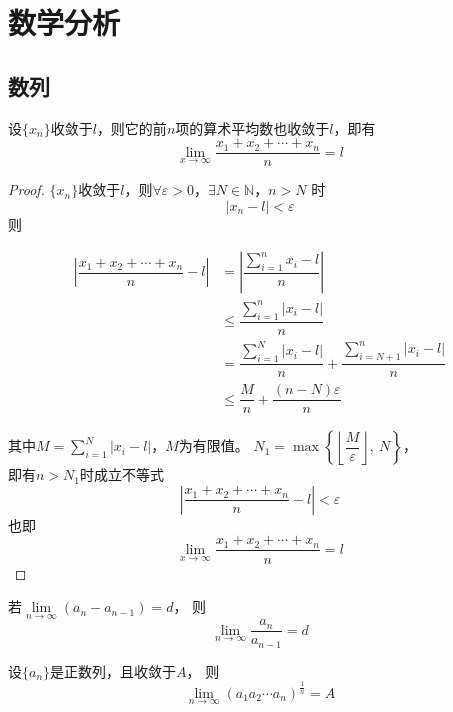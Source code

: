 \chapter{数学分析}

\section{数列}

\begin{proposition}[Cauthy命题]

    设$\{x_n\}$收敛于$l$，则它的前$n$项的算术平均数也收敛于$l$，即有
    $$\lim_{x\to\infty}{\dfrac{x_1 + x_2 + \cdots + x_n}{n}} = l$$

\end{proposition}

\begin{proof}

    $\{x_n\}$收敛于$l$，则$\forall \varepsilon > 0$，$\exists N \in \mathbb{N}$，$n > N$ 时
    $$|x_n - l| < \varepsilon$$
    则

    \begin{align*}
        \left|\dfrac{x_1 + x_2 + \cdots + x_n}{n} - l\right| &= \left|\dfrac{\sum\limits_{i=1}^{n}{x_i - l}}{n}\right|\\
        &\leq \dfrac{\sum\limits_{i=1}^{n}{|x_i - l|}}{n}\\
        &= \dfrac{\sum\limits_{i=1}^{N}{|x_i - l|}}{n} + \dfrac{\sum\limits_{i=N+1}^{n}{|x_i - l|}}{n}\\
        &\leq \dfrac{M}{n} + \dfrac{(n-N)\varepsilon}{n}
    \end{align*}

    其中$M = \sum\limits_{i=1}^{N}{|x_i-l|}$，$M$为有限值。
    $N_1 = \max\left\{\left\lfloor\dfrac{M}{\varepsilon}\right\rfloor,\ N \right\}$，\\
    即有$n>N_1$时成立不等式
    $$\left| \dfrac{x_1 + x_2 + \cdots + x_n}{n} - l \right| < \varepsilon$$
    也即
    $$\lim_{x\to\infty}{\dfrac{x_1 + x_2 + \cdots + x_n}{n}} = l$$

\end{proof}

\begin{corollary}[Cauthy命题推论]

    若$\lim\limits_{n\to\infty}{(a_n-a_{n-1})}=d$，
    则
    $$\lim_{n\to\infty}{\dfrac{a_n}{a_{n-1}}}=d$$

\end{corollary}

\begin{corollary}[Cauthy命题推论]

    设$\{a_n\}$是正数列，且收敛于$A$，
    则
    $$\lim_{n\to\infty}{(a_1a_2\cdots a_n)^{\frac{1}{n}}}=A$$

\end{corollary}

